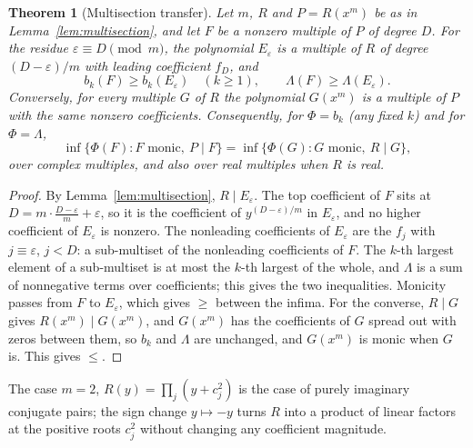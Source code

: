 \documentclass[11pt]{article}
\newtheorem{theorem}{Theorem}[section]
\begin{document}
\begin{theorem}[Multisection transfer]\label{thm:transfer}
Let $m$, $R$ and $P=R(x^m)$ be as in Lemma~\ref{lem:multisection}, and let
$F$ be a nonzero multiple of $P$ of degree $D$.  For the residue
$\varepsilon\equiv D\pmod m$, the polynomial $E_\varepsilon$ is a multiple of
$R$ of degree $(D-\varepsilon)/m$ with leading coefficient $f_D$, and
\[
  b_k(F)\ge b_k(E_\varepsilon)\quad(k\ge1),\qquad
  \Lambda(F)\ge\Lambda(E_\varepsilon).
\]
Conversely, for every multiple $G$ of $R$ the polynomial $G(x^m)$ is a
multiple of $P$ with the same nonzero coefficients.  Consequently, for
$\Phi=b_k$ (any fixed $k$) and for $\Phi=\Lambda$,
\[
  \inf\{\Phi(F):F\text{ monic},\ P\mid F\}
  =\inf\{\Phi(G):G\text{ monic},\ R\mid G\},
\]
over complex multiples, and also over real multiples when $R$ is real.
\end{theorem}

\begin{proof}
By Lemma~\ref{lem:multisection}, $R\mid E_\varepsilon$.  The top coefficient
of $F$ sits at $D=m\cdot\frac{D-\varepsilon}m+\varepsilon$, so it is the
coefficient of $y^{(D-\varepsilon)/m}$ in $E_\varepsilon$, and no higher
coefficient of $E_\varepsilon$ is nonzero.  The nonleading coefficients of
$E_\varepsilon$ are the $f_j$ with $j\equiv\varepsilon$, $j<D$: a
sub-multiset of the nonleading coefficients of $F$.  The $k$-th largest
element of a sub-multiset is at most the $k$-th largest of the whole, and
$\Lambda$ is a sum of nonnegative terms over coefficients; this gives the
two inequalities.  Monicity passes from $F$ to $E_\varepsilon$, which gives
$\ge$ between the infima.  For the converse, $R\mid G$ gives
$R(x^m)\mid G(x^m)$, and $G(x^m)$ has the coefficients of $G$ spread out
with zeros between them, so $b_k$ and $\Lambda$ are unchanged, and
$G(x^m)$ is monic when $G$ is.  This gives $\le$.
\end{proof}

The case $m=2$, $R(y)=\prod_j(y+c_j^2)$ is the case of purely imaginary
conjugate pairs; the sign change $y\mapsto-y$ turns $R$ into a product of
linear factors at the positive roots $c_j^2$ without changing any
coefficient magnitude.
\end{document}

